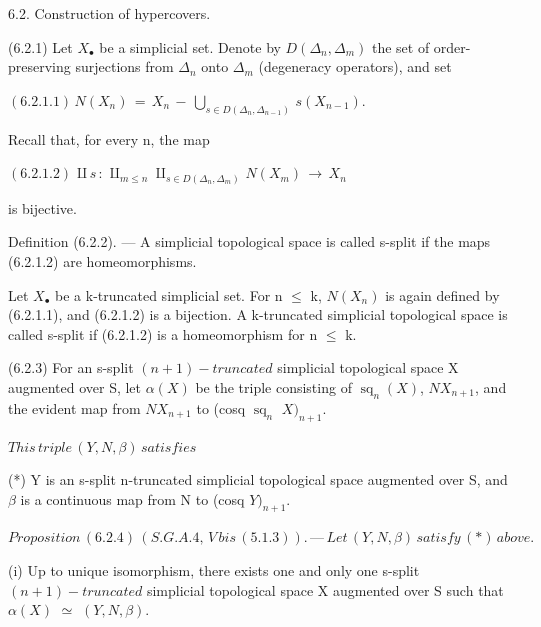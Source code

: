 \documentclass[11pt,twoside]{article}
\newcommand{\DFormula}[1]{%
  \par\smallskip\noindent\hspace*{0pt}\(\displaystyle #1\)\par\smallskip
}
\begin{document}
6.2. Construction of hypercovers.\par
\par\medskip
(6.2.1) Let \(X_{\bullet }\) be a simplicial set. Denote by \(D(\Delta _{n},\Delta _{m})\) the set of order-preserving surjections from \(\Delta _{n}\) onto \(\Delta _{m}\) (degeneracy operators), and set\par
\par\medskip
\DFormula{(6.2.1.1)\,N(X_{n})\,=\,X_{n}\,−\,⋃_{s\in D(\Delta _{n},\Delta _{n−1})}\,s(X_{n−1}).}
\par\medskip
Recall that, for every n, the map\par
\par\medskip
\DFormula{(6.2.1.2)\,⨿s\,:\,⨿_{m\leq n}\,⨿_{s\in D(\Delta _{n},\Delta _{m})}\,N(X_{m})\,\to \,X_{n}}
\par\medskip
is bijective.\par
\par\medskip
Definition (6.2.2). — A simplicial topological space is called s-split if the maps (6.2.1.2) are homeomorphisms.\par
\par\medskip
Let \(X_{\bullet }\) be a k-truncated simplicial set. For n \(\leq \) k, \(N(X_{n})\) is again defined by (6.2.1.1), and (6.2.1.2) is a bijection. A k-truncated simplicial topological space is called s-split if (6.2.1.2) is a homeomorphism for n \(\leq \) k.\par
\par\medskip
(6.2.3) For an s-split \((n+1)-truncated\) simplicial topological space X augmented over S, let \(\alpha (X)\) be the triple consisting of \(\operatorname{sq}_{n}(X)\), \(NX_{n+1}\), and the evident map from \(NX_{n+1}\) to (cosq \(\operatorname{sq}_{n}\) \(X)_{n+1}\).\par
\par\medskip
\DFormula{This\,triple\,(Y,N,\beta )\,satisfies}
\par\medskip
(*) Y is an s-split n-truncated simplicial topological space augmented over S, and \(\beta \) is a continuous map from N to (cosq \(Y)_{n+1}\).\par
\par\medskip
\DFormula{Proposition\,(6.2.4)\,(S.G.A.4,\,V\,bis\,(5.1.3)).\,—\,Let\,(Y,N,\beta )\,satisfy\,(\ast )\,above.}
\par\medskip
(i) Up to unique isomorphism, there exists one and only one s-split \((n+1)-truncated\) simplicial topological space X augmented over S such that \(\alpha (X)\) \(\simeq \) \((Y,N,\beta )\).\par
\end{document}
